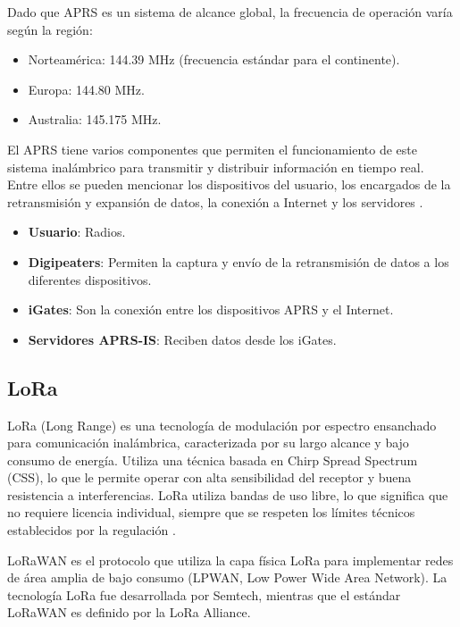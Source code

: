 \documentclass[conference]{IEEEtran}
\begin{document}
Dado que APRS es un sistema de alcance global, la frecuencia de operación varía según la región:

\begin{itemize}
    \item Norteamérica: 144.39 MHz (frecuencia estándar para el continente).
    \item Europa: 144.80 MHz.
    \item Australia: 145.175 MHz.
\end{itemize}

El APRS tiene varios componentes que permiten el funcionamiento de este sistema inalámbrico para transmitir y distribuir información en tiempo real. Entre ellos se pueden mencionar los dispositivos del usuario, los encargados de la retransmisión y expansión de datos, la conexión a Internet y los servidores \cite{Mottern2025_APRSdemystified}.

\begin{itemize}
    \item \textbf{Usuario}: Radios.
    \item \textbf{Digipeaters}: Permiten la captura y envío de la retransmisión de datos a los diferentes dispositivos.
    \item \textbf{iGates}: Son la conexión entre los dispositivos APRS y el Internet.
    \item \textbf{Servidores APRS-IS}: Reciben datos desde los iGates.
\end{itemize}

\subsection{LoRa}

LoRa (Long Range) es una tecnología de modulación por espectro ensanchado para comunicación inalámbrica, caracterizada por su largo alcance y bajo consumo de energía. Utiliza una técnica basada en Chirp Spread Spectrum (CSS), lo que le permite operar con alta sensibilidad del receptor y buena resistencia a interferencias. LoRa utiliza bandas de uso libre, lo que significa que no requiere licencia individual, siempre que se respeten los límites técnicos establecidos por la regulación \cite{Augustin2016_LoRa}.

LoRaWAN es el protocolo que utiliza la capa física LoRa para implementar redes de área amplia de bajo consumo (LPWAN, Low Power Wide Area Network). La tecnología LoRa fue desarrollada por Semtech, mientras que el estándar LoRaWAN es definido por la LoRa Alliance.
\end{document}
